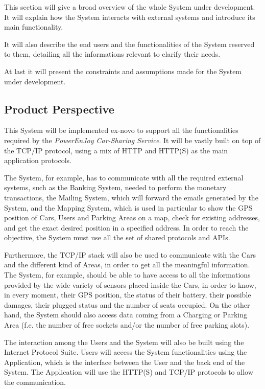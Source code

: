 This section will give a broad overview of the whole System under development. It will explain how the System interacts with external systems and introduce its main functionality.

It will also describe the end users and the functionalities of the System reserved to them, detailing all the informations relevant to clarify their needs.

At last it will present the constraints and assumptions made for the System under development.

\subsection{Product Perspective}
This System will be implemented ex-novo to support all the functionalities required by the \textit{PowerEnJoy Car-Sharing Service}. It will be vastly built on top of the TCP/IP protocol, using a mix of HTTP and HTTP(S) as the main application protocols.

The System, for example, has to communicate with all the required external systems, such as the Banking System, needed to perform the monetary transactions, the Mailing System, which will forward the emails generated by the System, and the Mapping System, which is used in particular to show the GPS position of Cars, Users and Parking Areas on a map, check for existing addresses, and get the exact desired position in a specified address. In order to reach the objective, the System must use all the set of shared protocols and APIs.

Furthermore, the TCP/IP stack will also be used to communicate with the Cars and the different kind of Areas, in order to get all the meaningful information.
The System, for example, should be able to have access to all the informations provided by the wide variety of sensors placed inside the Cars, in order to know, in every moment, their GPS position, the status of their battery, their possible damages, their plugged status and the number of seats occupied. 
On the other hand, the System should also access data coming from a Charging or Parking Area (f.e. the number of free sockets and/or the number of free parking slots).

The interaction among the Users and the System will also be built using the Internet Protocol Suite. Users will access the System functionalities using the Application, which is the interface between the User and the back end of the System. The Application will use the HTTP(S) and TCP/IP protocols to allow the communication.

